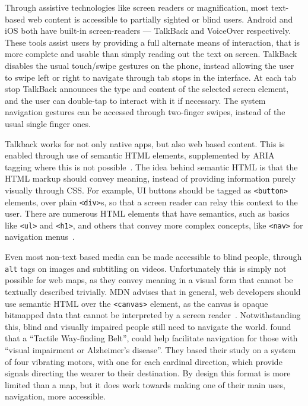 \documentclass[hyphens]{final_report}
\begin{document}
Through assistive technologies like screen readers or magnification, most text-based web content is accessible to partially sighted or blind users. Android and iOS both have built-in screen-readers --- TalkBack and VoiceOver respectively. These tools assist users by providing a full alternate means of interaction, that is more complete and usable than simply reading out the text on screen. TalkBack disables the usual touch/swipe gestures on the phone, instead allowing the user to swipe left or right to navigate through tab stops in the interface. At each tab stop TalkBack announces the type and content of the selected screen element, and the user can double-tap to interact with it if necessary. The system navigation gestures can be accessed through two-finger swipes, instead of the usual single finger ones.

Talkback works for not only native apps, but also web based content. This is enabled through use of semantic HTML elements, supplemented by ARIA tagging where this is not possible~\cite{w3c-aria}. The idea behind semantic HTML is that the HTML markup should convey meaning, instead of providing information purely visually through CSS\@. For example, UI buttons should be tagged as \texttt{<button>} elements, over plain \texttt{<div>}s, so that a screen reader can relay this context to the user. There are numerous HTML elements that have semantics, such as basics like \texttt{<ul>} and \texttt{<h1>}, and others that convey more complex concepts, like \texttt{<nav>} for navigation menus~\cite{mdn-accessibility-basis}.

Even most non-text based media can be made accessible to blind people, through \texttt{alt} tags on images and subtitling on videos. Unfortunately this is simply not possible for web maps, as they convey meaning in a visual form that cannot be textually described trivially. MDN advises that in general, web developers should use semantic HTML over the \texttt{<canvas>} element, as the canvas is opaque bitmapped data that cannot be interpreted by a screen reader~\cite{mdn-element-reference-canvas}. Notwithstanding this, blind and visually impaired people still need to navigate the world. \textcite{accessible-wayfinding-belt} found that a ``Tactile Way-finding Belt'', could help facilitate navigation for those with ``visual impairment or Alzheimer’s disease''. They based their study on a system of four vibrating motors, with one for each cardinal direction, which provide signals directing the wearer to their destination. By design this format is more limited than a map, but it does work towards making one of their main uses, navigation, more accessible.
\end{document}
